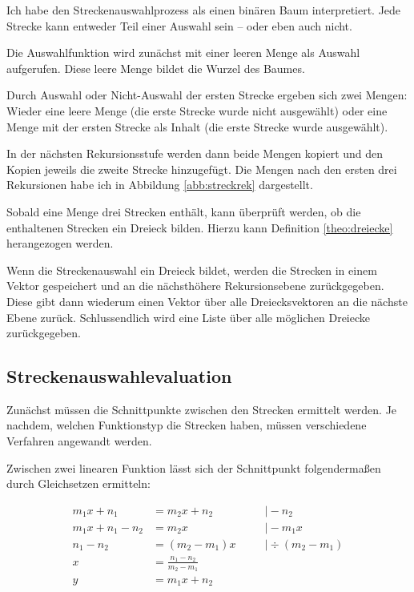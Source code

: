 Ich habe den Streckenauswahlprozess als einen binären Baum interpretiert. Jede Strecke kann entweder Teil einer Auswahl sein -- oder eben auch nicht.

Die Auswahlfunktion wird zunächst mit einer leeren Menge als Auswahl aufgerufen.
Diese leere Menge bildet die Wurzel des Baumes.

Durch Auswahl oder Nicht-Auswahl der ersten Strecke ergeben sich zwei Mengen: Wieder eine
leere Menge (die erste Strecke wurde nicht ausgewählt) oder eine Menge mit der ersten
Strecke als Inhalt (die erste Strecke wurde ausgewählt).

In der nächsten Rekursionsstufe werden dann beide Mengen kopiert und den Kopien jeweils
die zweite Strecke hinzugefügt. Die Mengen nach den ersten drei Rekursionen habe ich
in Abbildung \ref{abb:streckrek} dargestellt.

Sobald eine Menge drei Strecken enthält, kann überprüft werden, ob die enthaltenen
Strecken ein Dreieck bilden.
Hierzu kann Definition \ref{theo:dreiecke} herangezogen werden.

Wenn die Streckenauswahl ein Dreieck bildet, werden die Strecken in einem Vektor
gespeichert und an die nächsthöhere Rekursionsebene zurückgegeben.
Diese gibt dann wiederum einen Vektor über alle Dreiecksvektoren an die nächste Ebene
zurück.
Schlussendlich wird eine Liste über alle möglichen Dreiecke zurückgegeben.

\subsection{Streckenauswahlevaluation}
Zunächst müssen die Schnittpunkte zwischen den Strecken ermittelt werden.
Je nachdem, welchen Funktionstyp die Strecken haben,
müssen verschiedene Verfahren angewandt werden.

Zwischen zwei linearen Funktion lässt sich der Schnittpunkt folgendermaßen durch
Gleichsetzen ermitteln:

\begin{equation}
    \begin{aligned}
        m_1x+n_1 &= m_2x+n_2             &&\quad\vert -n_2          \\
        m_1x+n_1-n_2 &= m_2x             &&\quad\vert -m_1x         \\
        n_1-n_2 &= (m_2-m_1)x            &&\quad\vert \div(m_2-m_1) \\
        x &= \frac{n_1-n_2}{m_2-m_1}                                \\
        y &= m_1x+n_2                                               \\
    \end{aligned}
    \label{eq:linearschnitt}
\end{equation}

